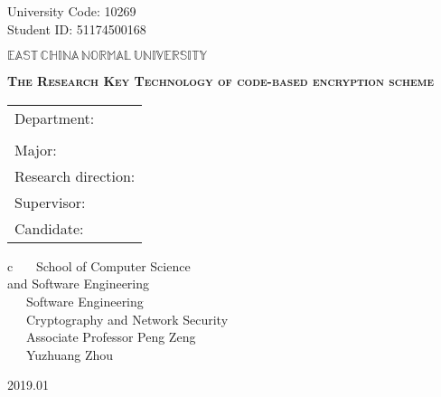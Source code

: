 \newpage

\pagestyle{empty}

\hskip 1.83cm {\large University Code: 10269}\\
\hspace*{\fill} {\large Student ID: 51174500168}

\vskip 2cm

\begin{center}
{\Huge $\mathbb{EAST}\,\mathbb{CHINA}\,\mathbb{NORMAL}\,
\mathbb{UNIVERSITY}$}
\end{center}

\vskip 3cm

\begin{center}
\bfseries{\scshape{\huge The Research Key Technology of code-based encryption scheme}}\\
\end{center}

\vskip 2cm {\large
\begin{center}
\begin{tabular}{l}
Department:\\ \\
Major:\\
Research direction:\\
Supervisor:\\
Candidate:
\end{tabular}
\begin{tabular}c
~~~School of Computer Science \\ and Software Engineering       \\
\hline ~~~Software Engineering    \\
\hline ~~~Cryptography and Network Security\\
\hline ~~~Associate Professor Peng Zeng\\
\hline ~~~Yuzhuang Zhou\\
\hline
\end{tabular}
\end{center}}

\vskip 30mm

\begin{center}
{\Large 2019.01}
\end{center}
